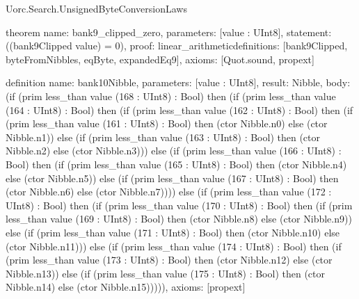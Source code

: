 \begin{lexlean}{Uorc.Search.UnsignedByteConversionLaws}
\begin{semanticmodule}
theorem{
  name: bank9_clipped_zero,
  parameters: [value : UInt8],
  statement: ((bank9Clipped value) = 0),
  proof: linear_arithmetic{definitions: [bank9Clipped, byteFromNibbles, eqByte, expandedEq9]},
  axioms: [Quot.sound, propext]
}

definition{
  name: bank10Nibble,
  parameters: [value : UInt8],
  result: Nibble,
  body: (if (prim less_than value (168 : UInt8) : Bool) then (if (prim less_than value (164 : UInt8) : Bool) then (if (prim less_than value (162 : UInt8) : Bool) then (if (prim less_than value (161 : UInt8) : Bool) then (ctor Nibble.n0) else (ctor Nibble.n1)) else (if (prim less_than value (163 : UInt8) : Bool) then (ctor Nibble.n2) else (ctor Nibble.n3))) else (if (prim less_than value (166 : UInt8) : Bool) then (if (prim less_than value (165 : UInt8) : Bool) then (ctor Nibble.n4) else (ctor Nibble.n5)) else (if (prim less_than value (167 : UInt8) : Bool) then (ctor Nibble.n6) else (ctor Nibble.n7)))) else (if (prim less_than value (172 : UInt8) : Bool) then (if (prim less_than value (170 : UInt8) : Bool) then (if (prim less_than value (169 : UInt8) : Bool) then (ctor Nibble.n8) else (ctor Nibble.n9)) else (if (prim less_than value (171 : UInt8) : Bool) then (ctor Nibble.n10) else (ctor Nibble.n11))) else (if (prim less_than value (174 : UInt8) : Bool) then (if (prim less_than value (173 : UInt8) : Bool) then (ctor Nibble.n12) else (ctor Nibble.n13)) else (if (prim less_than value (175 : UInt8) : Bool) then (ctor Nibble.n14) else (ctor Nibble.n15))))),
  axioms: [propext]
}


\end{semanticmodule}
\end{lexlean}

